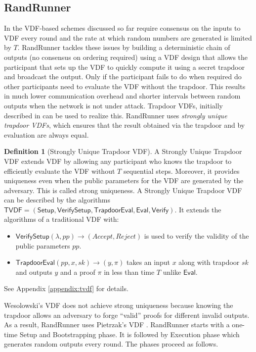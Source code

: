 \documentclass[letterpaper,twocolumn,10pt]{article}
\theoremstyle{definition}
\newtheorem{definition}[theorem]{Definition}
\theoremstyle{remark}
\begin{document}
\subsection{RandRunner}
\label{subsection:randrunner}
In the VDF-based schemes discussed so far require consensus on the inputs to VDF every round and the rate at which random numbers are generated is limited by $T$. RandRunner \cite{schindler2021randrunner} tackles these issues by building a deterministic chain of outputs (no consensus on ordering required) using a VDF design that allows the participant that sets up the VDF to quickly compute it using a secret trapdoor and broadcast the output. Only if the participant fails to do when required do other participants need to evaluate the VDF without the trapdoor. This results in much lower communication overhead and shorter intervals between random outputs when the network is not under attack. Trapdoor VDFs, initially described in \cite{wesolowski2019efficient} can be used to realize this. RandRunner uses \emph{strongly unique trapdoor VDFs}, which ensures that the result obtained via the trapdoor and by evaluation are always equal.
\begin{definition}[Strongly Unique Trapdoor VDF]
A Strongly Unique Trapdoor VDF extends VDF by allowing any participant who knows the trapdoor to efficiently evaluate the VDF without $T$ sequential steps. Moreover, it provides uniqueness even when the public parameters for the VDF are generated by the adversary. This is called strong uniqueness. A Strongly Unique Trapdoor VDF can be described by the algorithms $\mathsf{TVDF = (Setup,VerifySetup, TrapdoorEval, Eval, Verify)}$. It extends the algorithms of a traditional VDF with:
\begin{itemize}
    \item $\mathsf{VerifySetup}(\lambda, pp) \rightarrow (Accept, Reject)$ is used to verify the validity of the public parameters $pp$.
    \item $\mathsf{TrapdoorEval}(pp,x,sk) \rightarrow (y, \pi)$ takes an input $x$  along with trapdoor $sk$ and outputs $y$ and a proof $\pi$ in less than time $T$ unlike $\mathsf{Eval}$.
\end{itemize}
See Appendix \ref{appendix:tvdf} for details.
\end{definition}
Wesolowski’s VDF \cite{wesolowski2019efficient} does not achieve strong uniqueness because knowing the trapdoor allows an adversary to forge ``valid'' proofs for different invalid outputs. As a result, RandRunner uses Pietrzak's VDF \cite{pietrzak2018simple}. RandRunner starts with a one-time Setup and Bootstrapping phase. It is followed by Execution phase which generates random outputs every round. The phases proceed as follows.
\end{document}
